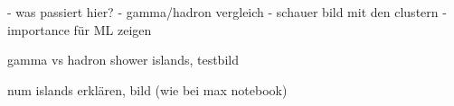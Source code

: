 \begin{frame}
    - was passiert hier?
    - gamma/hadron vergleich
    - schauer bild mit den clustern
    - importance für ML zeigen
\end{frame}

\begin{frame}{gamma vs hadron shower}
    islands, testbild
\end{frame}

\begin{frame}{num islands}
    erklären, bild (wie bei max notebook)
\end{frame}